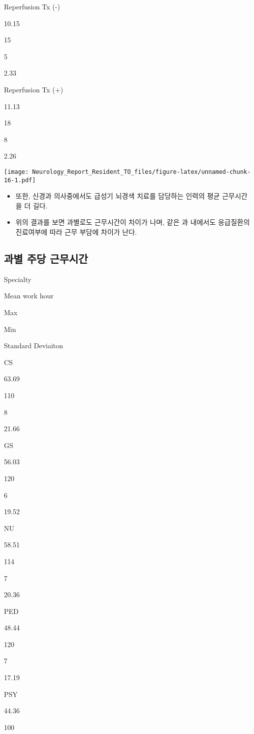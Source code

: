 \documentclass[]{book}
\begin{document}
Reperfusion Tx (-)

10.15

15

5

2.33

Reperfusion Tx (+)

11.13

18

8

2.26

\texttt{[image: Neurology\_Report\_Resident\_TO\_files/figure-latex/unnamed-chunk-16-1.pdf]}

\begin{itemize}
\item
  또한, 신경과 의사중에서도 급성기 뇌경색 치료를 담당하는 인력의 평균 근무시간을 더 길다.
\item
  위의 결과를 보면 과별로도 근무시간이 차이가 나며, 같은 과 내에서도 응급질환의 진료여부에 따라 근무 부담에 차이가 난다.
\end{itemize}

\hypertarget{section-18}{%
\subsection{과별 주당 근무시간}\label{section-18}}

Specialty

Mean work hour

Max

Min

Standard Deviaiton

CS

63.69

110

8

21.66

GS

56.03

120

6

19.52

NU

58.51

114

7

20.36

PED

48.44

120

7

17.19

PSY

44.36

100
\end{document}
